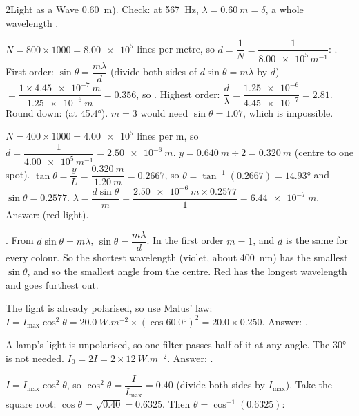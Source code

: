 \begin{chapteranswers}{2}{Light as a Wave}
        \qty{0.60}{m}). Check: at \qty{567}{Hz}, $\lambda = \qty{0.60}{m} = \delta$, a whole
        wavelength \cmark.
  \item $N = 800 \times 1000 = \num{8.00e5}$ lines per metre, so
        $d = \dfrac{1}{N} = \dfrac{1}{\num{8.00e5}\,\unit{m^{-1}}}$:
        .
        First order: $\sin\theta = \dfrac{m\lambda}{d}$ (divide both sides of
        $d\sin\theta = m\lambda$ by $d$) $= \dfrac{1 \times \qty{4.45e-7}{m}}
        {\qty{1.25e-6}{m}} = 0.356$, so .
        Highest order: $\dfrac{d}{\lambda} = \dfrac{\num{1.25e-6}}{\num{4.45e-7}} = 2.81$.
        Round down:  (at \ang{45.4}). $m = 3$ would need
        $\sin\theta = 1.07$, which is impossible.
  \item $N = 400 \times 1000 = \num{4.00e5}$ lines per m, so
        $d = \dfrac{1}{\num{4.00e5}\,\unit{m^{-1}}} = \qty{2.50e-6}{m}$.
        $y = \qty{0.640}{m} \div 2 = \qty{0.320}{m}$ (centre to one spot).
        $\tan\theta = \dfrac{y}{L} = \dfrac{\qty{0.320}{m}}{\qty{1.20}{m}} = 0.2667$, so
        $\theta = \tan^{-1}(0.2667) = \ang{14.93}$ and $\sin\theta = 0.2577$.
        $\lambda = \dfrac{d\sin\theta}{m} = \dfrac{\qty{2.50e-6}{m} \times 0.2577}{1}
        = \qty{6.44e-7}{m}$. Answer:  (red light).
  \item {}. From $d\sin\theta = m\lambda$, $\sin\theta = \dfrac{m\lambda}{d}$.
        In the first order $m = 1$, and $d$ is the same for every colour. So the shortest
        wavelength (violet, about \qty{400}{nm}) has the smallest $\sin\theta$, and so
        the smallest angle from the centre. Red has the longest wavelength and goes
        furthest out.
  \item The light is already polarised, so use Malus' law:
        $I = I_\mathrm{max}\cos^2\theta = \qty{20.0}{W.m^{-2}} \times (\cos\ang{60.0})^2
        = 20.0 \times 0.250$. Answer: .
  \item A lamp's light is unpolarised, so one filter passes half of it at any angle. The
        \ang{30} is not needed. $I_0 = 2I = 2 \times \qty{12}{W.m^{-2}}$. Answer:
        .
  \item $I = I_\mathrm{max}\cos^2\theta$, so $\cos^2\theta = \dfrac{I}{I_\mathrm{max}} = 0.40$
        (divide both sides by $I_\mathrm{max}$). Take the square root:
        $\cos\theta = \sqrt{0.40} = 0.6325$. Then $\theta = \cos^{-1}(0.6325)$:

\end{chapteranswers}
